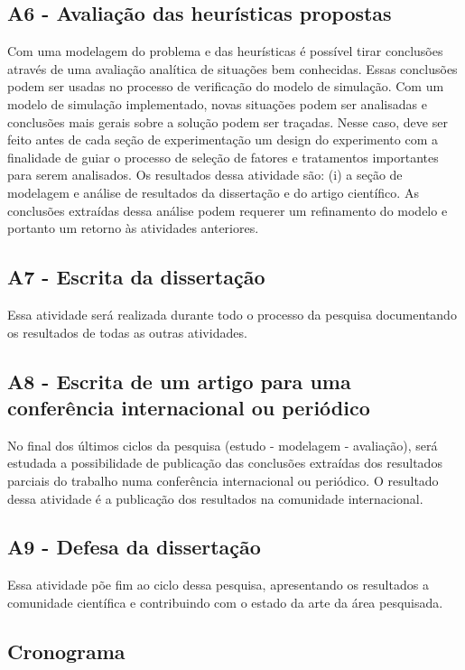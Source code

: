 \documentclass[a4paper,titlepage,12pt]{article}
\begin{document}
\subsection*{A6 - Avaliação das heurísticas propostas}
Com uma modelagem do problema e das heurísticas é possível tirar conclusões através de uma avaliação analítica de situações bem conhecidas. Essas conclusões podem ser usadas no processo de verificação do modelo de simulação. Com um modelo de simulação implementado, novas situações podem ser analisadas e conclusões mais gerais sobre a solução podem ser traçadas. Nesse caso, deve ser feito antes de cada seção de experimentação um design do experimento com a finalidade de guiar o processo de seleção de fatores e tratamentos importantes para serem analisados. Os resultados dessa atividade são: (i) a seção de modelagem e análise de resultados da dissertação e do artigo científico. As conclusões extraídas dessa análise podem requerer um refinamento do modelo e portanto um retorno às atividades anteriores. 

\subsection*{A7 - Escrita da dissertação}
Essa atividade será realizada durante todo o processo da pesquisa documentando os resultados de todas as outras atividades.

\subsection*{A8 - Escrita de um artigo para uma conferência internacional ou periódico}
No final dos últimos ciclos da pesquisa (estudo - modelagem - avaliação), será estudada a possibilidade de publicação das conclusões extraídas dos resultados parciais do trabalho numa conferência internacional ou periódico. O resultado dessa atividade é a publicação dos resultados na comunidade internacional.

\subsection*{A9 - Defesa da dissertação}
Essa atividade põe fim ao ciclo dessa pesquisa, apresentando os resultados a comunidade científica e contribuindo com o estado da arte da área pesquisada. 

\newpage
\subsection{Cronograma}
\label{cronograma}
\end{document}
